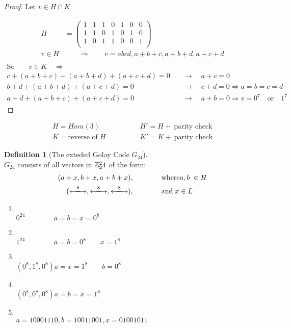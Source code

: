 \documentclass[]{article}
\theoremstyle{definition}
\newtheorem*{defn}{Definition}
\theoremstyle{remark}
\numberwithin{equation}{section}
\begin{document}
		\begin{proof}
		Let $v\in H\cap K$

		\begin{align*}
			H &= \begin{pmatrix}
				1 & 1 & 1 & 0 & 1 & 0 & 0 \\
				1 & 1 & 0 & 1 & 0 & 1 & 0 \\
				1 & 0 & 1 & 1 & 0 & 0 & 1 \\
			\end{pmatrix} \\
			v \in H & \qquad \Rightarrow \qquad v = abcd, a+b+c, a+b+d, a+c+d\\
		\end{align*}
		\begin{align*}
		\text{So} \qquad v \in K \quad\Rightarrow\quad \\
			c + (a+b+c) + (a+b+d) + (a+c+d) = 0 &\quad\rightarrow\quad a +c = 0\\
			b + d + (a + b + d) + (a + c +d)= 0 &\quad\rightarrow\quad c + d = 0 \Rightarrow a = b = c = d \\
			a + d + (a + b + c) + (a + c +d)= 0 &\quad\rightarrow\quad a + b = 0 \Rightarrow v = 0^7\quad\text{or}\quad 1^7
		\end{align*}
		\end{proof}
		\begin{align*}
			H = Ham(3) \qquad & \qquad H' = H + \ \text{parity check}\\
			K = \text{reverse of}\; H \qquad & \qquad K' = K + \ \text{parity check}
		\end{align*}

		\begin{defn}[The exteded Golay Code $G_24$]\hfill\\
		$G_24$ consists of all vectors in $\mathbb{Z}_2^24$ of the form:
		\begin{align*}
		(a +x, b +x, a + b + x), \qquad&\qquad \text{where} a,b\;\in H\\
		(\xlongleftrightarrow{8}, \xlongleftrightarrow{8}, \xlongleftrightarrow{8}), \qquad&\qquad \text{and}\;x\in L\\
		\end{align*}

		\begin{enumerate}
			\item\hfill\\
			$0^24\qquad \qquad a = b = x = 0^8$
			\item\hfill\\
			$1^24\qquad \qquad a = b = 0^8 \qquad x = 1^8$
			\item\hfill\\
			$(0^8, 1^8, 0^8) a =x = 1^8 \qquad b=0^8$
			\item\hfill\\
			$(0^8, 0^8, 0^8) a = b =x = 1^8$
			\item\hfill\\
			$a = 10001110, b = 10011001, x = 01001011$
		\end{enumerate}
		\end{defn}
\end{document}
